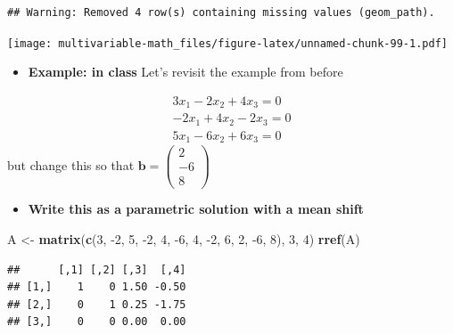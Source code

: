 \documentclass[
]{book}
\newenvironment{Shaded}{\begin{snugshade}}{\end{snugshade}}
\newcommand{\DecValTok}[1]{\textcolor[rgb]{0.00,0.00,0.81}{#1}}
\newcommand{\KeywordTok}[1]{\textcolor[rgb]{0.13,0.29,0.53}{\textbf{#1}}}
\newcommand{\NormalTok}[1]{#1}
\newcommand{\StringTok}[1]{\textcolor[rgb]{0.31,0.60,0.02}{#1}}
\providecommand{\tightlist}{%
  \setlength{\itemsep}{0pt}\setlength{\parskip}{0pt}}
\theoremstyle{definition}
\theoremstyle{definition}
\theoremstyle{definition}
\theoremstyle{remark}
\begin{document}
\begin{verbatim}
## Warning: Removed 4 row(s) containing missing values (geom_path).
\end{verbatim}

\texttt{[image: multivariable-math\_files/figure-latex/unnamed-chunk-99-1.pdf]}

\begin{itemize}
\tightlist
\item
  \textbf{Example: in class}
  Let's revisit the example from before
\end{itemize}

\[
\begin{aligned}
3 x_1 - 2 x_2 + 4 x_3 = 0 \\
- 2 x_1 + 4 x_2 - 2 x_3 = 0 \\
5 x_1 - 6 x_2 + 6 x_3 = 0
\end{aligned}
\]
but change this so that \(\mathbf{b} = \begin{pmatrix} 2 \\ -6 \\ 8 \end{pmatrix}\)

\begin{itemize}
\tightlist
\item
  \textbf{Write this as a parametric solution with a mean shift}
\end{itemize}

\begin{Shaded}
\begin{Highlighting}[]
\NormalTok{A <-}\StringTok{ }\KeywordTok{matrix}\NormalTok{(}\KeywordTok{c}\NormalTok{(}\DecValTok{3}\NormalTok{, }\DecValTok{-2}\NormalTok{, }\DecValTok{5}\NormalTok{, }\DecValTok{-2}\NormalTok{, }\DecValTok{4}\NormalTok{, }\DecValTok{-6}\NormalTok{, }\DecValTok{4}\NormalTok{, }\DecValTok{-2}\NormalTok{, }\DecValTok{6}\NormalTok{, }\DecValTok{2}\NormalTok{, }\DecValTok{-6}\NormalTok{, }\DecValTok{8}\NormalTok{), }\DecValTok{3}\NormalTok{, }\DecValTok{4}\NormalTok{)}
\KeywordTok{rref}\NormalTok{(A)}
\end{Highlighting}
\end{Shaded}

\begin{verbatim}
##      [,1] [,2] [,3]  [,4]
## [1,]    1    0 1.50 -0.50
## [2,]    0    1 0.25 -1.75
## [3,]    0    0 0.00  0.00
\end{verbatim}
\end{document}
